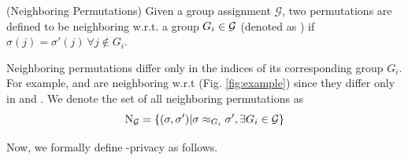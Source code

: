 \begin{defn}   (Neighboring Permutations) Given a group assignment $\mathcal{G}$,  two permutations   are defined to be neighboring w.r.t. a group $G_i \in \mathcal{G}$ (denoted as ) if  $\sigma(j) = \sigma'(j) \ \forall j \notin G_i$.
\end{defn} \vspace{-0.25cm}
Neighboring permutations differ only in the indices of its corresponding group $G_i$.
 For example,  and  are neighboring w.r.t \scalebox{0.9}{$G_1$} (Fig. \ref{fig:example}) since they differ only in \scalebox{0.9}{$\sigma(1), \sigma(2), \sigma(5), \sigma(6), \sigma(7)$} and \scalebox{0.9}{$\sigma(8)$}. We denote the set of all neighboring permutations as %
    \vspace{0.1cm}\begin{gather}      \mathrm{N}_{\calG}=\{(\sigma,\sigma')|\sigma \approx_{G_i} \sigma', \exists G_i \in \calG \}     \vspace{0.2cm}\end{gather}    \vspace{0.2cm}
Now, we formally define \name-privacy as follows.
